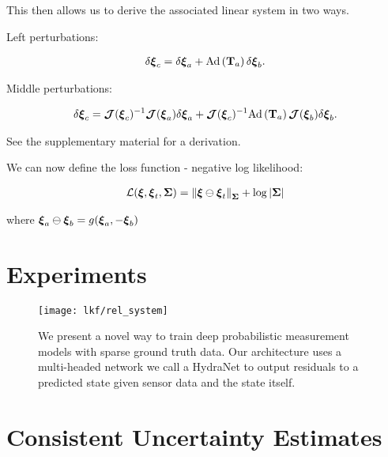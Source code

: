 This then allows us to derive the associated linear system in two ways.

Left perturbations:


\begin{align}
\delta \boldsymbol{\mathbf{\xi}}_c =  \delta \boldsymbol{\mathbf{\xi}}_a + \mathrm{Ad}\left(\boldsymbol{\mathbf{T}}_a\right) \delta \boldsymbol{\mathbf{\xi}}_b.
\end{align}


Middle perturbations:

\begin{align}
\delta \boldsymbol{\mathbf{\xi}}_c = \boldsymbol{\mathbf{\mathcal{J}}}(\boldsymbol{\mathbf{\xi}}_c)^{-1} \boldsymbol{\mathbf{\mathcal{J}}}(\boldsymbol{\mathbf{\xi}}_a) \delta \boldsymbol{\mathbf{\xi}}_a + \boldsymbol{\mathbf{\mathcal{J}}}(\boldsymbol{\mathbf{\xi}}_c)^{-1}  \mathrm{Ad}\left(\boldsymbol{\mathbf{T}}_a\right) \boldsymbol{\mathbf{\mathcal{J}}}(\boldsymbol{\mathbf{\xi}}_b) \delta \boldsymbol{\mathbf{\xi}}_b.
\end{align}

See the supplementary material for a derivation.


We can now define the loss function - negative log likelihood:

\begin{align}
\mathcal{L}(\boldsymbol{\mathbf{\xi}}, \boldsymbol{\mathbf{\xi}}_t, \boldsymbol{\mathbf{\Sigma}}) = \left\Vert\boldsymbol{\mathbf{\xi}} \ominus \boldsymbol{\mathbf{\xi}}_t\right\Vert_{\boldsymbol{\mathbf{\Sigma}}} + \log{| \boldsymbol{\mathbf{\Sigma}} |}
\end{align}

where $\boldsymbol{\mathbf{\xi}}_a \ominus \boldsymbol{\mathbf{\xi}}_b = g(\boldsymbol{\mathbf{\xi}}_a, -\boldsymbol{\mathbf{\xi}}_b)$ 

\section{Experiments}

\begin{figure}
	\centering
	\texttt{[image: lkf/rel\_system]}
	\caption{We present a novel way to train deep probabilistic measurement models with sparse ground truth data. Our architecture uses a multi-headed network we call a HydraNet to output residuals to a predicted state given sensor data and the state itself.}
	\label{fig:lkf_system}
\end{figure}


\section{Consistent Uncertainty Estimates}

